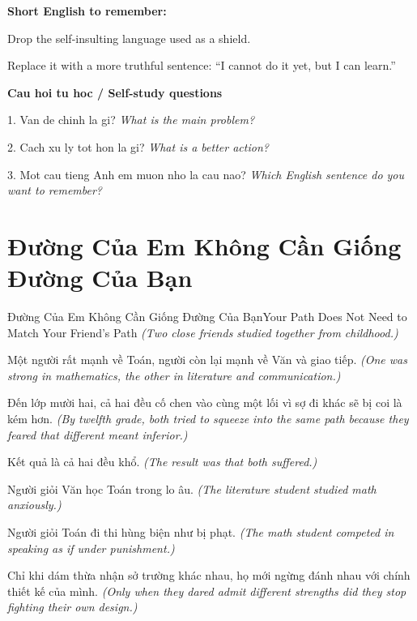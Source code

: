 \begin{ghinhoanh}
\textbf{Short English to remember:}

Drop the self-insulting language used as a shield.

Replace it with a more truthful sentence: ``I cannot do it yet, but I can learn.''

\end{ghinhoanh}

\begin{tuhocnhanh}
\textbf{Cau hoi tu hoc / Self-study questions}

1. Van de chinh la gi? \textit{What is the main problem?}

2. Cach xu ly tot hon la gi? \textit{What is a better action?}

3. Mot cau tieng Anh em muon nho la cau nao? \textit{Which English sentence do you want to remember?}
\end{tuhocnhanh}
\ngancach

\section{Đường Của Em Không Cần Giống Đường Của Bạn}
\begin{truyen}{Đường Của Em Không Cần Giống Đường Của Bạn}{Your Path Does Not Need to Match Your Friend’s Path}
\textit{(Two close friends studied together from childhood.)}

Một người rất mạnh về Toán, người còn lại mạnh về Văn và giao tiếp.
\textit{(One was strong in mathematics, the other in literature and communication.)}

Đến lớp mười hai, cả hai đều cố chen vào cùng một lối vì sợ đi khác sẽ bị coi là kém hơn.
\textit{(By twelfth grade, both tried to squeeze into the same path because they feared that different meant inferior.)}

Kết quả là cả hai đều khổ.
\textit{(The result was that both suffered.)}

Người giỏi Văn học Toán trong lo âu.
\textit{(The literature student studied math anxiously.)}

Người giỏi Toán đi thi hùng biện như bị phạt.
\textit{(The math student competed in speaking as if under punishment.)}

Chỉ khi dám thừa nhận sở trường khác nhau, họ mới ngừng đánh nhau với chính thiết kế của mình.
\textit{(Only when they dared admit different strengths did they stop fighting their own design.)}

\end{truyen}

